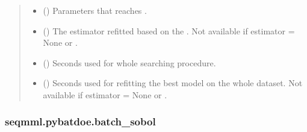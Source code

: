 \documentclass[letterpaper,10pt,english]{sphinxmanual}
\begin{document}
\begin{fulllineitems}
\begin{quote}
\begin{description}
\begin{itemize}
\item {} 
 () \textendash{} Parameters that reaches .

\item {} 
 () \textendash{} The estimator refitted based on the . 
Not available if estimator = None or .

\item {} 
 () \textendash{} Seconds used for whole searching procedure.

\item {} 
 () \textendash{} Seconds used for refitting the best model on the whole dataset.
Not available if estimator = None or .

\end{itemize}

\end{description}\end{quote}

\end{fulllineitems}



\subsubsection{seqmml.pybatdoe.batch\_sobol}
\label{\detokenize{apidoc:module-pybatdoe.batch_sobol}}\label{\detokenize{apidoc:seqmml-pybatdoe-batch-sobol}}
\end{document}

